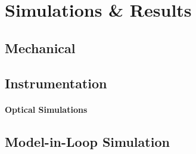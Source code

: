 \chapter{Simulations \& Results}
\thispagestyle{fancy}


\section{Mechanical}
\blindtext

\section{Instrumentation}
\subsubsection{Optical Simulations}

\section{Model-in-Loop Simulation}
\blindtext
